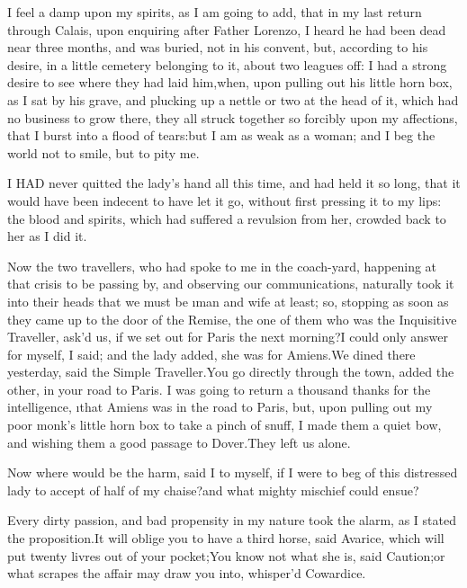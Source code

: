 \documentclass[twoside]{article}
\begin{document}
I feel a damp upon my spirits, as I am going to add, that in my last
return through Calais, upon enquiring after Father Lorenzo, I heard he
had been dead near three months, and was buried, not in his convent, but,
according to his desire, in a little cemetery belonging to it, about two
leagues off: I had a strong desire to see where they had laid him,\tsk when,
upon pulling out his little horn box, as I sat by his grave, and plucking
up a nettle or two at the head of it, which had no business to grow
there, they all struck together so forcibly upon my affections, that I
burst into a flood of tears:\tsk but I am as weak as a woman; and I beg the
world not to smile, but to pity me.






I HAD never quitted the lady’s hand all this time, and had held it so
long, that it would have been indecent to have let it go, without first
pressing it to my lips: the blood and spirits, which had suffered a
revulsion from her, crowded back to her as I did it.

Now the two travellers, who had spoke to me in the coach-yard, happening
at that crisis to be passing by, and observing our communications,
naturally took it into their heads that we must be \i{man and wife} at
least; so, stopping as soon as they came up to the door of the Remise,
the one of them who was the Inquisitive Traveller, ask’d us, if we set
out for Paris the next morning?\tsk I could only answer for myself, I said;
and the lady added, she was for Amiens.\tsk We dined there yesterday, said
the Simple Traveller.\tsk You go directly through the town, added the other,
in your road to Paris.  I was going to return a thousand thanks for the
intelligence, \i{that Amiens was in the road to Paris}, but, upon pulling
out my poor monk’s little horn box to take a pinch of snuff, I made them
a quiet bow, and wishing them a good passage to Dover.\tsk They left us
alone.\tsk 

\tsk Now where would be the harm, said I to myself, if I were to beg of this
distressed lady to accept of half of my chaise?\tsk and what mighty mischief
could ensue?

Every dirty passion, and bad propensity in my nature took the alarm, as I
stated the proposition.\tsk It will oblige you to have a third horse, said
Avarice, which will put twenty livres out of your pocket;\tsk You know not
what she is, said Caution;\tsk or what scrapes the affair may draw you into,
whisper’d Cowardice.\tsk 
\end{document}
